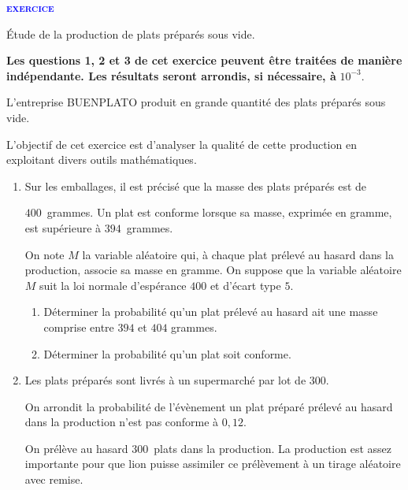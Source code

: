 \documentclass[a4paper,12pt]{article}
\newcommand{\cadre}[1]{%
\psframebox[framesep=.8em,linecolor=black,linewidth=0.25pt,framearc=0]{\begin{minipage}{\linewidth-1.6em}%
#1\end{minipage}}}
\newcounter{nexo}    %
\newcommand{\exo}{%
  \stepcounter{nexo} 
  \par{\textsf{\textbf{\textcolor{blue}{{\textsc{exercice  \arabic{nexo}}}}}}}
  }%
\begin{document}
\exo

 \medskip 

\medskip 


Étude de la production de plats préparés sous vide.

\medskip

\textbf{Les questions 1, 2 et 3 de cet exercice peuvent être traitées de manière
indépendante. Les résultats seront arrondis, si nécessaire, à } \boldmath $10^{-3}$\unboldmath{}.

L'entreprise BUENPLATO produit en grande quantité des plats préparés sous vide.

L'objectif de cet exercice est d'analyser la qualité de cette production en exploitant
divers outils mathématiques.

\medskip

\begin{enumerate}
\item Sur les emballages, il est précisé que la masse des plats préparés est de 

$400$~grammes. Un plat est conforme lorsque sa masse, exprimée en gramme, est
supérieure à $394$~grammes.

On note $M$ la variable aléatoire qui, à chaque plat prélevé au hasard dans la
production, associe sa masse en gramme. On suppose que la variable aléatoire
$M$ suit la loi normale d'espérance $400$ et d'écart type $5$.
	\begin{enumerate}
		\item Déterminer la probabilité qu'un plat prélevé au hasard ait une masse
comprise entre $394$ et $404$ grammes.


\cadre{
\vspace{1cm}\hspace{18cm}
}


		\item  Déterminer la probabilité qu'un plat soit conforme.
		
		\cadre{
\vspace{1cm}\hspace{18cm}
}

 	\end{enumerate}
\item Les plats préparés sont livrés à un supermarché par lot de $300$.
	
On arrondit la probabilité de l'évènement \og un plat préparé prélevé au hasard
dans la production n'est pas conforme \fg{} à $0,12$.
	
On prélève au hasard $300$~plats dans la production. La production est assez
importante pour que lion puisse assimiler ce prélèvement à un tirage aléatoire
avec remise.
	

\end{enumerate}
\end{document}
